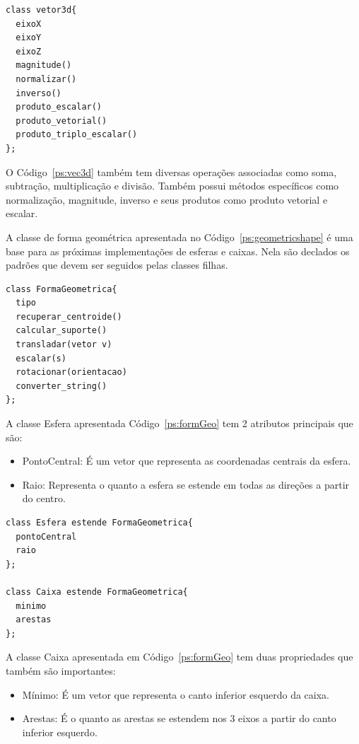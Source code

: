 \begin{lstlisting}[frame=single,caption=Modelagem prévia para vetor3d\label{ps:vec3d}]
class vetor3d{
  eixoX
  eixoY
  eixoZ
  magnitude()
  normalizar()
  inverso()
  produto_escalar()
  produto_vetorial()
  produto_triplo_escalar()
};
\end{lstlisting}

O Código~\ref{ps:vec3d} também tem diversas operações associadas como soma, subtração,
multiplicação e divisão. Também possui métodos específicos como normalização,
magnitude, inverso e seus produtos como produto vetorial e escalar.


A classe de forma geométrica apresentada no Código~\ref{ps:geometricshape} é uma base para as próximas implementações de
esferas e caixas. Nela são declados os padrões que devem ser seguidos pelas classes filhas.

\begin{lstlisting}[frame=single,caption=Modelagem prévia para interface de forma geométrica\label{ps:geometricshape}]
class FormaGeometrica{
  tipo
  recuperar_centroide()
  calcular_suporte()
  transladar(vetor v)
  escalar(s)
  rotacionar(orientacao)
  converter_string()
};
\end{lstlisting}

A classe Esfera apresentada Código~\ref{ps:formGeo} tem 2 atributos principais que são:
\begin{itemize}
  \item PontoCentral: É um vetor que representa as coordenadas centrais da esfera.
  \item Raio: Representa o quanto a esfera se estende em todas as direções a partir do centro.
\end{itemize}

\begin{lstlisting}[frame=single,caption=Modelagem prévia para esfera 3d e caixa \label{ps:formGeo}]
class Esfera estende FormaGeometrica{
  pontoCentral
  raio
};

class Caixa estende FormaGeometrica{
  minimo
  arestas
};
\end{lstlisting}



A classe Caixa apresentada em Código~\ref{ps:formGeo} tem duas propriedades que também são importantes:
\begin{itemize}
  \item Mínimo: É um vetor que representa o canto inferior esquerdo da caixa.
  \item Arestas: É o quanto as arestas se estendem nos 3 eixos a partir do canto inferior esquerdo.
\end{itemize}

